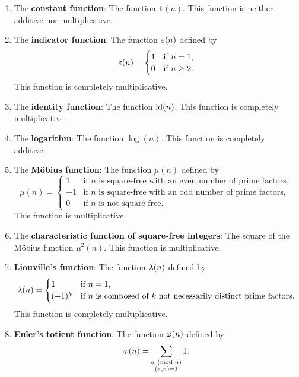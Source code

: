     \begin{enumerate}[label*=(\roman*)]
      \item The \textbf{constant function}: The function \(\mathbf{1}(n)\). This function is neither additive nor multiplicative.
      \item The \textbf{indicator function}: The function \(\varepsilon(n)\) defined by
      \[
        \varepsilon(n) = \begin{cases} 1 & \text{if \(n = 1\)}, \\ 0 & \text{if \(n \ge 2\)}. \end{cases}
      \]
      This function is completely multiplicative.
      \item The \textbf{identity function}: The function \(\operatorname{\textrm{id}}(n)\). This function is completely multiplicative.
      \item The \textbf{logarithm}: The function \(\log(n)\). This function is completely additive.
      \item The \textbf{M\"obius function}: The function \(\mu(n)\) defined by
      \[
        \mu(n) = \begin{cases} 1 & \text{if \(n\) is square-free with an even number of prime factors}, \\ -1 & \text{if \(n\) is square-free with an odd number of prime factors}, \\ 0 & \text{if \(n\) is not square-free}. \end{cases}
      \]
      This function is multiplicative.
      \item The \textbf{characteristic function of square-free integers}: The square of the M\"obius function \(\mu^{2}(n)\). This function is multiplicative.
      \item \textbf{Liouville's function}: The function \(\lambda(n)\) defined by
      \[
        \lambda(n) = \begin{cases} 1 & \text{if \(n = 1\)}, \\ (-1)^{k} & \text{if \(n\) is composed of \(k\) not necessarily distinct prime factors}. \end{cases}
      \]
      This function is completely multiplicative.
      \item \textbf{Euler's totient function}: The function \(\varphi(n)\) defined by
      \[
        \varphi(n) = \sum_{\substack{a \ (\mathrm{mod}\text{ }n) \\ (a,n) = 1}}1.
\]
\end{enumerate}
